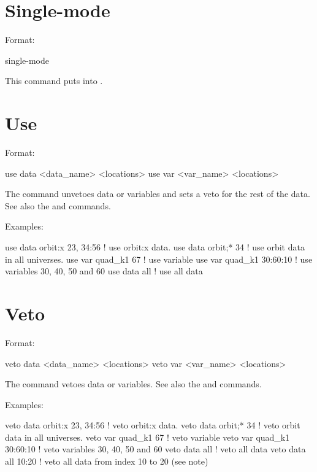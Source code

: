 \section{Single-mode}
\label{s:sing}

Format:
\begin{example}
  single-mode
\end{example}

\vskip 0.2in 
This command puts \tao into . 

\section{Use}
\label{s:use}

Format:
\begin{example}
  use data  <data_name> <locations>
  use var <var_name> <locations>
\end{example}

\vskip 0.2in 
The  command unvetoes data or variables and sets a veto for
the rest of the data. See also the  and 
commands.

Examples:
\begin{example}
  use data orbit:x  23, 34:56  ! use orbit:x data.
  use data orbit;* 34          ! use orbit data in all universes.
  use var quad_k1 67           ! use variable
  use var quad_k1 30:60:10     ! use variables 30, 40, 50 and 60
  use data all                 ! use all data
\end{example}


\section{Veto}
\label{s:veto}

Format:
\begin{example}
  veto data <data_name> <locations>
  veto var <var_name> <locations>
\end{example}

\vskip 0.2in 
The  command vetoes data or variables. See also the
 and  commands.

Examples:
\begin{example}
  veto data orbit:x  23, 34:56 ! veto orbit:x data.
  veto data orbit;* 34         ! veto orbit data in all universes.
  veto var quad_k1 67          ! veto variable
  veto var quad_k1 30:60:10    ! veto variables 30, 40, 50 and 60
  veto data all                ! veto all data
  veto data all 10:20          ! veto all data from index 10 to 20 (see note)
\end{example}

